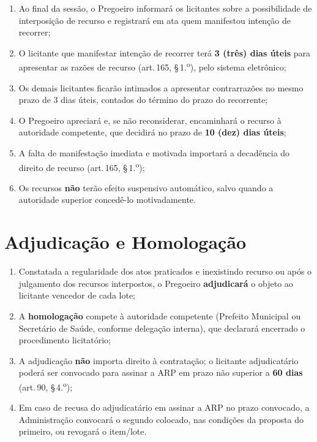\documentclass[12pt,a4paper]{article}
\newcommand{\art}[1]{art.\,#1}
\begin{document}
\begin{enumerate}
  \item Ao final da sessão, o Pregoeiro informará os licitantes sobre a possibilidade
    de interposição de recurso e registrará em ata quem manifestou intenção
    de recorrer;

  \item O licitante que manifestar intenção de recorrer terá \textbf{3 (três) dias
    úteis} para apresentar as razões de recurso (\art{165}, \S\,1.\textsuperscript{o}),
    pelo sistema eletrônico;

  \item Os demais licitantes ficarão intimados a apresentar contrarrazões no mesmo
    prazo de 3 dias úteis, contados do término do prazo do recorrente;

  \item O Pregoeiro apreciará e, se não reconsiderar, encaminhará o recurso à
    autoridade competente, que decidirá no prazo de \textbf{10 (dez) dias úteis};

  \item A falta de manifestação imediata e motivada importará a decadência do
    direito de recurso (\art{165}, \S\,1.\textsuperscript{o});

  \item Os recursos \textbf{não} terão efeito suspensivo automático, salvo quando
    a autoridade superior concedê-lo motivadamente.
\end{enumerate}

\section{Adjudicação e Homologação}

\begin{enumerate}
  \item Constatada a regularidade dos atos praticados e inexistindo recurso ou após
    o julgamento dos recursos interpostos, o Pregoeiro \textbf{adjudicará} o objeto
    ao licitante vencedor de cada lote;

  \item A \textbf{homologação} compete à autoridade competente (Prefeito Municipal
    ou Secretário de Saúde, conforme delegação interna), que declarará encerrado
    o procedimento licitatório;

  \item A adjudicação \textbf{não} importa direito à contratação; o licitante
    adjudicatário poderá ser convocado para assinar a ARP em prazo não superior
    a \textbf{60 dias} (\art{90}, \S\,4.\textsuperscript{o});

  \item Em caso de recusa do adjudicatário em assinar a ARP no prazo convocado,
    a Administração convocará o segundo colocado, nas condições da proposta do
    primeiro, ou revogará o item/lote.
\end{enumerate}
\end{document}
